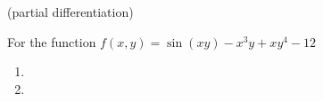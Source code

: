 (partial differentiation)

\nl For the function $f(x,y) = \sin(xy) - x^3y + xy^4 -12$

\begin{enumerate}
\item 
\item 
\end{enumerate}

